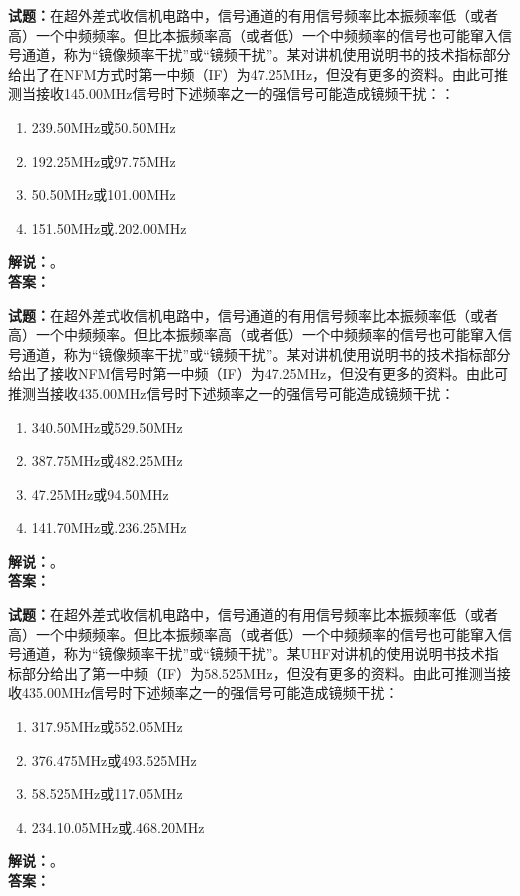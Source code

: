 \documentclass{ctexbook}
\begin{document}
\bigskip




\noindent\textbf{试题：}在超外差式收信机电路中，信号通道的有用信号频率比本振频率低（或者高）一个中频频率。但比本振频率高（或者低）一个中频频率的信号也可能窜入信号通道，称为“镜像频率干扰”或“镜频干扰”。某对讲机使用说明书的技术指标部分给出了在NFM方式时第一中频（IF）为47.25\unit{\MHz}，但没有更多的资料。由此可推测当接收145.00\unit{\MHz}信号时下述频率之一的强信号可能造成镜频干扰：：
\begin{enumerate}[leftmargin=3em]
\item 239.50\unit{\MHz}或50.50\unit{\MHz}
\item 192.25\unit{\MHz}或97.75\unit{\MHz}
\item 50.50\unit{\MHz}或101.00\unit{\MHz}
\item 151.50\unit{\MHz}或.202.00\unit{\MHz}
\end{enumerate}
\noindent\textbf{解说：}\textbf{}。\\\noindent\textbf{答案：}

\bigskip




\noindent\textbf{试题：}在超外差式收信机电路中，信号通道的有用信号频率比本振频率低（或者高）一个中频频率。但比本振频率高（或者低）一个中频频率的信号也可能窜入信号通道，称为“镜像频率干扰”或“镜频干扰”。某对讲机使用说明书的技术指标部分给出了接收NFM信号时第一中频（IF）为47.25\unit{\MHz}，但没有更多的资料。由此可推测当接收435.00\unit{\MHz}信号时下述频率之一的强信号可能造成镜频干扰：
\begin{enumerate}[leftmargin=3em]
\item 340.50\unit{\MHz}或529.50\unit{\MHz}
\item 387.75\unit{\MHz}或482.25\unit{\MHz}
\item 47.25\unit{\MHz}或94.50\unit{\MHz}
\item 141.70\unit{\MHz}或.236.25\unit{\MHz}
\end{enumerate}
\noindent\textbf{解说：}\textbf{}。\\\noindent\textbf{答案：}

\bigskip




\noindent\textbf{试题：}在超外差式收信机电路中，信号通道的有用信号频率比本振频率低（或者高）一个中频频率。但比本振频率高（或者低）一个中频频率的信号也可能窜入信号通道，称为“镜像频率干扰”或“镜频干扰”。某UHF对讲机的使用说明书技术指标部分给出了第一中频（IF）为58.525\unit{\MHz}，但没有更多的资料。由此可推测当接收435.00\unit{\MHz}信号时下述频率之一的强信号可能造成镜频干扰：
\begin{enumerate}[leftmargin=3em]
\item 317.95\unit{\MHz}或552.05\unit{\MHz}
\item 376.475\unit{\MHz}或493.525\unit{\MHz}
\item 58.525\unit{\MHz}或117.05\unit{\MHz}
\item 234.10.05\unit{\MHz}或.468.20\unit{\MHz}
\end{enumerate}
\noindent\textbf{解说：}\textbf{}。\\\noindent\textbf{答案：}
\end{document}

